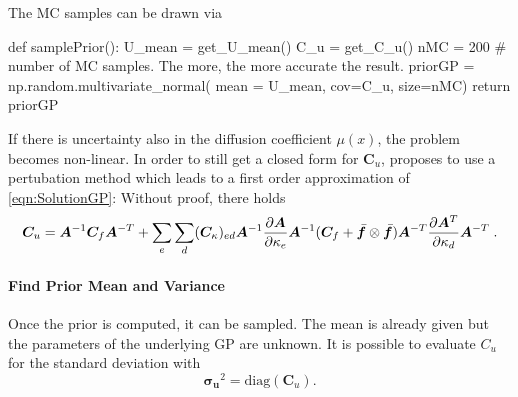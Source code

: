 \documentclass[%
  a4paper,oneside,%
  11pt,%
  smallchapters,
  style=printdev,
  extramargin,
  green,%
  rgb, <cmyk>
  ]{tubsbook}
\begin{document}
The MC samples can be drawn via
\begin{python}
def samplePrior():
	U_mean = get_U_mean()
	C_u = get_C_u()
	nMC = 200 # number of MC samples. The more, the more accurate the result.
	priorGP = np.random.multivariate_normal(
		mean = U_mean, cov=C_u,
		size=nMC)
	return priorGP
\end{python}

If there is uncertainty also in the diffusion coefficient $\mu(x)$, the problem becomes non-linear. In order to still get a closed form for $\bm{C}_u$, \cite[p. 7]{girolami2021} proposes to use a pertubation method which leads to a first order approximation of \eqref{eqn:SolutionGP}: Without proof, there holds 
\begin{equation}
\bm{C}_u = \bm{A}^{-1} \bm{C}_f \bm{A}^{-T} + \sum_e \sum_d (\bm{C}_{\kappa})_{ed} \bm{A}^{-1} \pdv{\bm{A}}{\kappa_e} \bm{A}^{-1} (\bm{C}_f + \bar{\bm{f}} \otimes \bar{\bm{f}}) \bm{A}^{-T}\pdv{\bm{A}^T}{\kappa_d} \bm{A}^{-T} \;.
\end{equation}


\paragraph{Find Prior Mean and Variance}
Once the prior is computed, it can be sampled. The mean is already given but the parameters of the underlying GP are unknown. It is possible to evaluate $C_u$ for the standard deviation with
\begin{equation}
\bm{\sigma_u}^2 =  \mathrm{diag}(\bm{C}_u).
\label{eqn:varCu}
\end{equation}
\end{document}
